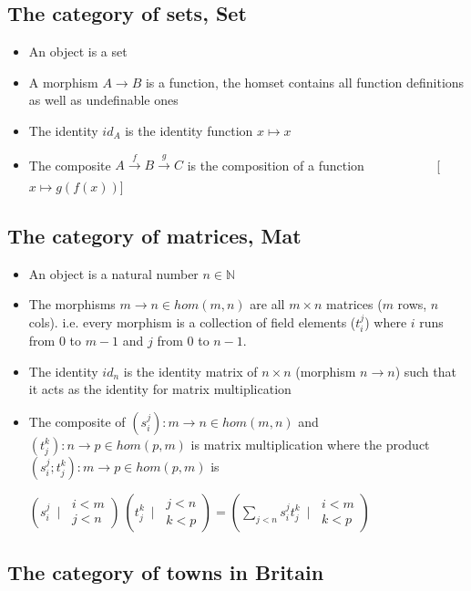 \documentclass[../main.tex]{subfiles}
\begin{document}
\subsection{The category of sets, Set}

\begin{itemize}
  \item An object is a set
  \item A morphism $A \rightarrow B$ is a function, the homset contains all function definitions as well as undefinable ones
  \item The identity $id_A$ is the identity function $x \mapsto x$
  \item The composite $A \xrightarrow[]{f} B \xrightarrow[]{g} C$ is the composition of a function ~~~~~~~~~~ [$x \mapsto g (f(x))$]
\end{itemize}

\subsection{The category of matrices, Mat}

\begin{itemize}
  \item An object is a natural number $n \in \mathbb{N}$
  \item The morphisms $m \rightarrow n \in hom(m,n)$ are all $m \times n$ matrices ($m$ rows, $n$ cols). i.e. every morphism is a collection of field elements ($t_i^j$) where $i$ runs from 0 to $m-1$ and $j$ from 0 to $n-1$.
  \item The identity $id_n$ is the identity matrix of $n \times n$ (morphism $n \rightarrow n$) such that it acts as the identity for matrix multiplication
  \item The composite of $(s_i^j) : m \rightarrow n \in hom(m,n)$ and $(t_j^k) : n \rightarrow p \in hom(p,m)$ is matrix multiplication where the product $(s_i^j ; t_j^k) : m \rightarrow p \in hom(p,m)$ is

$(s_i^j ~\mid~ \substack{i < m \\ j < n}) ~ (t_j^k  ~\mid~  \substack{j < n \\ k < p}) = (\sum\limits_{j<n} {s_i^j t_j^k} \ \mid \ \substack{i < m \\ k < p})$

\end{itemize}

\subsection{The category of towns in Britain}
\end{document}
